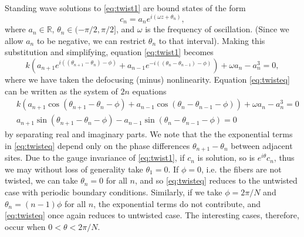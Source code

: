 \documentclass[12pt,reqno]{amsart}
\def\R{{\mathbb R}}
\begin{document}
Standing wave solutions to \cref{eq:twist1} are bound states of the form
\begin{equation}\label{eq:ansatz1}
c_n = a_n e^{i (\omega z + \theta_n) },
\end{equation}
where $a_n \in \R$, $\theta_n \in (-\pi/2, \pi/2]$, and $\omega$ is the frequency of oscillation. (Since we allow $a_n$ to be negative, we can restrict $\theta_n$ to that interval). Making this substitution and simplifying, equation \cref{eq:twist1} becomes
\begin{equation}\label{eq:twisteq}
k\left( a_{n+1} e^{i((\theta_{n+1}-\theta_n)-\phi)} + a_{n-1} e^{-i((\theta_n - \theta_{n-1})-\phi)}\right) + \omega a_n - a_n^3 = 0,
\end{equation}
where we have taken the defocusing (minus) nonlinearity. Equation \cref{eq:twisteq} can be written as the system of $2n$ equations
\begin{equation}\label{eq:twisteqreal}
\begin{aligned}
&k\left( a_{n+1} \cos(\theta_{n+1}-\theta_n-\phi) + a_{n-1} \cos(\theta_n - \theta_{n-1}-\phi)\right) + \omega a_n -  a_n^3 = 0 \\\
&a_{n+1} \sin(\theta_{n+1}-\theta_n-\phi) - a_{n-1} \sin(\theta_n - \theta_{n-1}-\phi) = 0
\end{aligned}
\end{equation}
by separating real and imaginary parts. We note that the the exponential terms in \cref{eq:twisteq} depend only on the phase differences $\theta_{n+1}-\theta_n$ between adjacent sites. Due to the gauge invariance of \cref{eq:twist1}, if $c_n$ is solution, so is $e^{i \theta} c_n$, thus we may without loss of generality take $\theta_1 = 0$. If $\phi = 0$, i.e. the fibers are not twisted, we can take $\theta_n = 0$ for all $n$, and so \cref{eq:twisteq} reduces to the untwisted case with periodic boundary conditions. Similarly, if we take $\phi = 2 \pi/N$ and $\theta_n = (n-1)\phi$ for all $n$, the exponential terms do not contribute, and \cref{eq:twisteq} once again reduces to untwisted case. The interesting cases, therefore, occur when $0 < \theta < 2 \pi/N$. 
\end{document}
